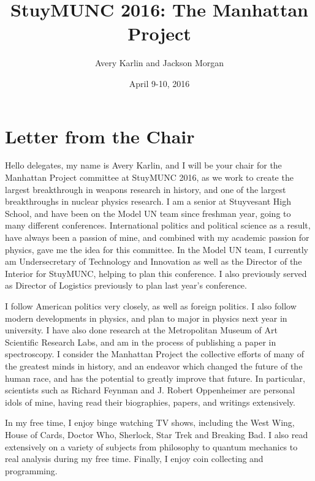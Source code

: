 \documentclass[11 pt, twoside]{article}
\begin{document}
\title{StuyMUNC 2016: The Manhattan Project}
\author{Avery Karlin and Jackson Morgan}
\date{April 9-10, 2016}

\maketitle
\newpage
\tableofcontents
\vspace{11pt}
\newpage

\section{Letter from the Chair}
Hello delegates, my name is Avery Karlin, and I will be your chair for the Manhattan Project committee at StuyMUNC 2016, as we work to create the largest breakthrough in weapons research in history, and one of the largest breakthroughs in nuclear physics research. I am a senior at Stuyvesant High School, and have been on the Model UN team since freshman year, going to many different conferences. International politics and political science as a result, have always been a passion of mine, and combined with my academic passion for physics, gave me the idea for this committee. In the Model UN team, I currently am Undersecretary of Technology and Innovation as well as the Director of the Interior for StuyMUNC, helping to plan this conference. I also previously served as Director of Logistics previously to plan last year's conference.

I follow American politics very closely, as well as foreign politics. I also follow modern developments in physics, and plan to major in physics next year in university. I have also done research at the Metropolitan Museum of Art Scientific Research Labs, and am in the process of publishing a paper in spectroscopy. I consider the Manhattan Project the collective efforts of many of the greatest minds in history, and an endeavor which changed the future of the human race, and has the potential to greatly improve that future. In particular, scientists such as Richard Feynman and J. Robert Oppenheimer are personal idols of mine, having read their biographies, papers, and writings extensively.

In my free time, I enjoy binge watching TV shows, including the West Wing, House of Cards, Doctor Who, Sherlock, Star Trek and Breaking Bad. I also read extensively on a variety of subjects from philosophy to quantum mechanics to real analysis during my free time. Finally, I enjoy coin collecting and programming.
\end{document}
